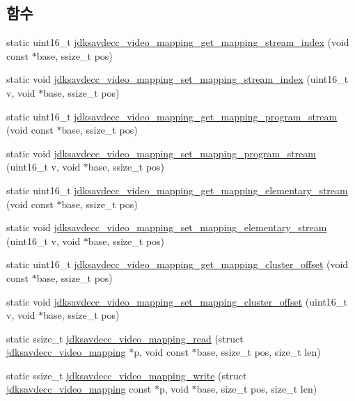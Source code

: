 \subsection*{함수}
\begin{DoxyCompactItemize}
\item 
static uint16\+\_\+t \hyperlink{group__video__mapping_ga7688f5d9329a936329a254fcb5a266ad}{jdksavdecc\+\_\+video\+\_\+mapping\+\_\+get\+\_\+mapping\+\_\+stream\+\_\+index} (void const $\ast$base, ssize\+\_\+t pos)
\item 
static void \hyperlink{group__video__mapping_ga00c997fcbc630af09b5c8dbb5eac39ee}{jdksavdecc\+\_\+video\+\_\+mapping\+\_\+set\+\_\+mapping\+\_\+stream\+\_\+index} (uint16\+\_\+t v, void $\ast$base, ssize\+\_\+t pos)
\item 
static uint16\+\_\+t \hyperlink{group__video__mapping_ga3527ae3f80ffc164d45b756c8a1f0824}{jdksavdecc\+\_\+video\+\_\+mapping\+\_\+get\+\_\+mapping\+\_\+program\+\_\+stream} (void const $\ast$base, ssize\+\_\+t pos)
\item 
static void \hyperlink{group__video__mapping_ga02cc3d925b3c5cef4be33ccf44ccac48}{jdksavdecc\+\_\+video\+\_\+mapping\+\_\+set\+\_\+mapping\+\_\+program\+\_\+stream} (uint16\+\_\+t v, void $\ast$base, ssize\+\_\+t pos)
\item 
static uint16\+\_\+t \hyperlink{group__video__mapping_ga1f99ad7682071756397dd4518a566d4b}{jdksavdecc\+\_\+video\+\_\+mapping\+\_\+get\+\_\+mapping\+\_\+elementary\+\_\+stream} (void const $\ast$base, ssize\+\_\+t pos)
\item 
static void \hyperlink{group__video__mapping_ga4ef9ae045e06fe1aa6275af9c7bc1f31}{jdksavdecc\+\_\+video\+\_\+mapping\+\_\+set\+\_\+mapping\+\_\+elementary\+\_\+stream} (uint16\+\_\+t v, void $\ast$base, ssize\+\_\+t pos)
\item 
static uint16\+\_\+t \hyperlink{group__video__mapping_ga4b598d018e5df68bd8f2d989a45d780a}{jdksavdecc\+\_\+video\+\_\+mapping\+\_\+get\+\_\+mapping\+\_\+cluster\+\_\+offset} (void const $\ast$base, ssize\+\_\+t pos)
\item 
static void \hyperlink{group__video__mapping_ga32152a52baa0793811420db284a10a92}{jdksavdecc\+\_\+video\+\_\+mapping\+\_\+set\+\_\+mapping\+\_\+cluster\+\_\+offset} (uint16\+\_\+t v, void $\ast$base, ssize\+\_\+t pos)
\item 
static ssize\+\_\+t \hyperlink{group__video__mapping_ga48d7f78cd000ae76bcff6f84d9a21115}{jdksavdecc\+\_\+video\+\_\+mapping\+\_\+read} (struct \hyperlink{structjdksavdecc__video__mapping}{jdksavdecc\+\_\+video\+\_\+mapping} $\ast$p, void const $\ast$base, ssize\+\_\+t pos, size\+\_\+t len)
\item 
static ssize\+\_\+t \hyperlink{group__video__mapping_gab8e55cf5e042fc4bc0ad45d6fe8fcf20}{jdksavdecc\+\_\+video\+\_\+mapping\+\_\+write} (struct \hyperlink{structjdksavdecc__video__mapping}{jdksavdecc\+\_\+video\+\_\+mapping} const $\ast$p, void $\ast$base, size\+\_\+t pos, size\+\_\+t len)
\end{DoxyCompactItemize}


